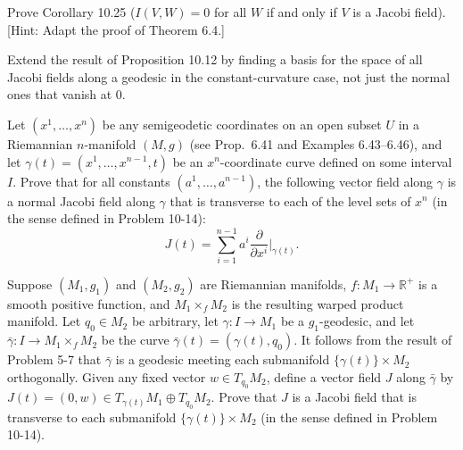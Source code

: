 \begin{exercise}\label{prob:jacobi-field-index-form}
Prove Corollary 10.25 ($I(V, W) = 0$ for all $W$ if and only if $V$ is a Jacobi field). [Hint: Adapt the proof of Theorem 6.4.]
\end{exercise}

\begin{exercise}\label{prob:jacobi-fields-constant-curvature}
Extend the result of Proposition 10.12 by finding a basis for the space of all Jacobi fields along a geodesic in the constant-curvature case, not just the normal ones that vanish at 0.
\end{exercise}

\begin{exercise}
\label{prob:jacobi-semigeodetic-transverse}

Let $(x^1,\ldots,x^n)$ be any semigeodetic coordinates on an open subset $U$ in a Riemannian $n$-manifold $(M,g)$ (see Prop.\ 6.41 and Examples 6.43--6.46), and let $\gamma(t) = (x^1,\ldots,x^{n-1},t)$ be an $x^n$-coordinate curve defined on some interval $I$. Prove that for all constants $(a^1,\ldots,a^{n-1})$, the following vector field along $\gamma$ is a normal Jacobi field along $\gamma$ that is transverse to each of the level sets of $x^n$ (in the sense defined in Problem 10-14):
\[
J(t) = \sum_{i=1}^{n-1} a^i \frac{\partial}{\partial x^i}\bigg|_{\gamma(t)}.
\]
\end{exercise}

\begin{exercise}
\label{prob:jacobi-warped-product}

Suppose $(M_1,g_1)$ and $(M_2,g_2)$ are Riemannian manifolds, $f: M_1 \to \mathbb{R}^+$ is a smooth positive function, and $M_1 \times_f M_2$ is the resulting warped product manifold. Let $q_0 \in M_2$ be arbitrary, let $\gamma: I \to M_1$ be a $g_1$-geodesic, and let $\bar{\gamma}: I \to M_1 \times_f M_2$ be the curve $\bar{\gamma}(t) = (\gamma(t),q_0)$. It follows from the result of Problem 5-7 that $\bar{\gamma}$ is a geodesic meeting each submanifold $\{\gamma(t)\} \times M_2$ orthogonally. Given any fixed vector $w \in T_{q_0}M_2$, define a vector field $J$ along $\bar{\gamma}$ by $J(t) = (0,w) \in T_{\gamma(t)}M_1 \oplus T_{q_0}M_2$. Prove that $J$ is a Jacobi field that is transverse to each submanifold $\{\gamma(t)\} \times M_2$ (in the sense defined in Problem 10-14).
\end{exercise}

